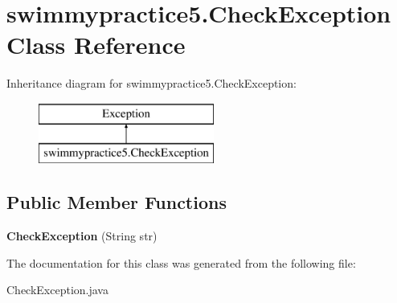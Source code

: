 \hypertarget{classswimmypractice5_1_1_check_exception}{}\section{swimmypractice5.\+Check\+Exception Class Reference}
\label{classswimmypractice5_1_1_check_exception}
Inheritance diagram for swimmypractice5.\+Check\+Exception\+:\begin{figure}[H]
\begin{center}
\leavevmode
\includegraphics[height=2.000000cm]{classswimmypractice5_1_1_check_exception}
\end{center}
\end{figure}
\subsection*{Public Member Functions}
\begin{DoxyCompactItemize}
\item 
\mbox{\label{classswimmypractice5_1_1_check_exception_a013350058bc8498f16e0381afa7059f2}} 
{\bfseries Check\+Exception} (String str)
\end{DoxyCompactItemize}


The documentation for this class was generated from the following file\+:\begin{DoxyCompactItemize}
\item 
Check\+Exception.\+java\end{DoxyCompactItemize}
